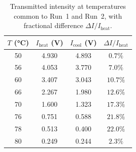 \begin{table}[ht]
  \centering
  \caption{Transmitted intensity at temperatures common to Run~1 and Run~2,
    with fractional difference $\Delta I/I_{\mathrm{heat}}$.}
  \label{tab:4a_hysteresis}
  \begin{tabular}{cccc}
    \toprule
    $T$ (\si{\celsius}) & $I_{\mathrm{heat}}$ (V) & $I_{\mathrm{cool}}$ (V) & $\Delta I/I_{\mathrm{heat}}$ \\
    \midrule
    50                  & 4.930                   & 4.893                   & $0.7\%$                      \\
    56                  & 4.053                   & 3.770                   & $7.0\%$                      \\
    60                  & 3.407                   & 3.043                   & $10.7\%$                     \\
    66                  & 2.267                   & 1.980                   & $12.6\%$                     \\
    70                  & 1.600                   & 1.323                   & $17.3\%$                     \\
    76                  & 0.751                   & 0.588                   & $21.8\%$                     \\
    78                  & 0.513                   & 0.400                   & $22.0\%$                     \\
    80                  & 0.249                   & 0.244                   & $2.3\%$                      \\
    \bottomrule
  \end{tabular}
\end{table}

